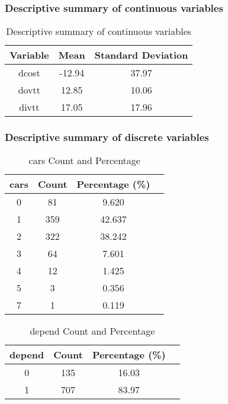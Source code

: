 \documentclass[a4paper]{article}
\begin{document}
\subsubsection*{Descriptive summary of continuous variables}
\begin{table}[h]
    \centering
    \begin{tabular}{|ccc|}
    \hline
    \textbf{Variable}   & \textbf{Mean} & \textbf{Standard Deviation} \\ \hline
    dcost       & -12.94          & 37.97      \\ %
    dovtt       & 12.85         &   10.06              \\ %
    divtt       & 17.05        & 17.96             \\ \hline
    \end{tabular}
    \caption{Descriptive summary of continuous variables}
    \label{tab:Descriptive summary of continuous variables}
    \end{table}

\subsubsection*{Descriptive summary of discrete variables}
\begin{table}[h!]
    \centering
    \begin{tabular}{|c|c|c|c|}
    \hline
    cars & \textbf{Count} & \textbf{Percentage (\%)} \\ \hline
    0    & 81    & 9.620           \\ %
    1    & 359   & 42.637          \\ %
    2    & 322   & 38.242          \\ %
    3    & 64    & 7.601           \\ %
    4    & 12    & 1.425           \\ %
    5    & 3     & 0.356           \\ %
    7    & 1     & 0.119           \\ \hline
    \end{tabular}
    \caption{cars Count and Percentage}
    \label{tab:cars_count}
\end{table}

\begin{table}[h!]
    \centering
    \begin{tabular}{|c|c|c|c|}
    \hline
    depend & \textbf{Count} & \textbf{Percentage (\%)} \\ \hline
    0    & 135   & 16.03      \\ %
    1    & 707   & 83.97          \\ \hline
    \end{tabular}
    \caption{depend Count and Percentage}
    \label{tab:depend_count}
\end{table}
\end{document}
